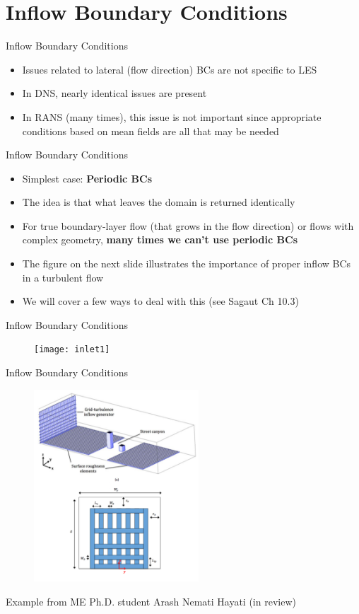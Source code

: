 \section{Inflow Boundary Conditions}
\begin{frame}{Inflow Boundary Conditions}
\begin{itemize}
	\item Issues related to lateral (flow direction) BCs are not specific to LES
	\item In DNS, nearly identical issues are present
	\item In RANS (many times), this issue is not important since appropriate conditions based on mean fields are all that may be needed
\end{itemize}
\end{frame}
\begin{frame}{Inflow Boundary Conditions}
\begin{itemize}
	\item Simplest case: \textbf{Periodic BCs}
	\item The idea is that what leaves the domain is returned identically
	\item For true boundary-layer flow (that grows in the flow direction) or flows with complex geometry, \textbf{many times we can't use periodic BCs}
	\item The figure on the next slide illustrates the importance of proper inflow BCs in a turbulent flow
	\item We will cover a few ways to deal with this (see Sagaut Ch 10.3)
\end{itemize}
\end{frame}
\begin{frame}{Inflow Boundary Conditions}
\begin{figure}
\texttt{[image: inlet1]}
\end{figure}
\end{frame}
\begin{frame}{Inflow Boundary Conditions}
\begin{figure}
\includegraphics[width=0.55\textwidth]{inlet2}	
\end{figure}
Example from ME Ph.D. student Arash Nemati Hayati (in review)
\end{frame}
